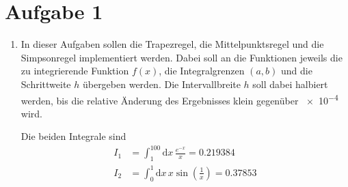 \section*{Aufgabe 1}

\begin{enumerate}[label=\alph*)]

    \item In dieser Aufgaben sollen die Trapezregel, die Mittelpunktsregel und die Simpsonregel implementiert werden.
    Dabei soll an die Funktionen jeweils die zu integrierende Funktion $f(x)$, die Integralgrenzen $(a,b)$ und die Schrittweite $h$ übergeben werden. 
    Die Intervallbreite $h$ soll dabei halbiert werden, bis die relative Änderung des Ergebnisses klein gegenüber \num{e-4} wird.
    
    Die beiden Integrale sind 
    \begin{align*}
        I_1 &= \int^{100}_1 \mathup{d} x \, \frac{e^{-x}}{x} = \num{0.219384} \\
        I_2 &= \int^1_0 \mathup{d} x \, x \sin\!\left(\frac{1}{x}\right) = \num{0.37853}\\
    \end{align*}

\end{enumerate}

